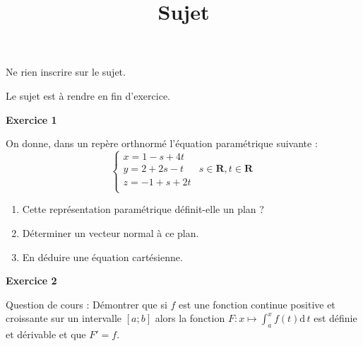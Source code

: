 \documentclass[12pt,a4paper,french]{article}
\author{}
\title{Sujet \no{14}}
\date{}
\begin{document}
\maketitle
\begin{center}Ne rien inscrire sur le sujet.

  Le sujet est à rendre en fin d'exercice.
\end{center}

\bigskip

\textbf{Exercice 1}

On donne, dans un repère orthnormé l'équation paramétrique suivante :
\[ \left\lbrace \begin{array}{lc}
    x = 1 - s + 4t &                                 \\
    y = 2 + 2s -t  & s\in\mathbf{R}, t\in \mathbf{R} \\
    z = -1 +s + 2t &                                 \\
\end{array}\right.\]

\begin{enumerate}
  \item Cette représentation paramétrique définit-elle un plan ?
  \item Déterminer un vecteur normal à ce plan.
  \item En déduire une équation cartésienne.
\end{enumerate}

\medskip

\textbf{Exercice 2}

Question de cours : Démontrer que si $f$ est une fonction continue
positive et croissante sur un intervalle $[a;b]$ alors la fonction
$F:x\mapsto \int_a^x f(t) \mathrm{d}\,t$ est définie et dérivable et que
$F' = f$.
\end{document}
